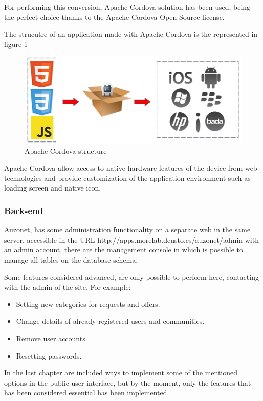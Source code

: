 \documentclass{DeustoFDP}
\begin{document}
For performing this conversion, Apache Cordova solution has been used, being the perfect choice thanks to the Apache Cordova Open Source license.

The strucutre of an application made with Apache Cordova is the represented in figure \ref{fig:cordova_workflow}

\begin{figure}[h]
\centering
\includegraphics[width=0.7\linewidth]{fig/cordova_workflow}
\caption[Apache Cordova structure]{Apache Cordova structure}
\label{fig:cordova_workflow}
\end{figure}

Apache Cordova allow access to native hardware features of the device from web technologies and provide customization of the application environment such as loading screen and native icon.

\subsubsection{Back-end}
Auzonet, has some administration functionality on a separate web in the same server, accessible in the URL http://apps.morelab.deusto.es/auzonet/admin with an admin account, there are the management console in which is possible to manage all tables on the database schema.

Some features considered advanced, are only possible to perform here, contacting with the admin of the site. For example:

\begin{itemize}
	\item Setting new categories for requests and offers.
	\item Change details of already registered users and communities.
	\item Remove user accounts.
	\item Resetting passwords.
\end{itemize}

In the last chapter are included ways to implement some of the mentioned options in the public user interface, but by the moment, only the features that has been considered essential has been implemented.
\end{document}
